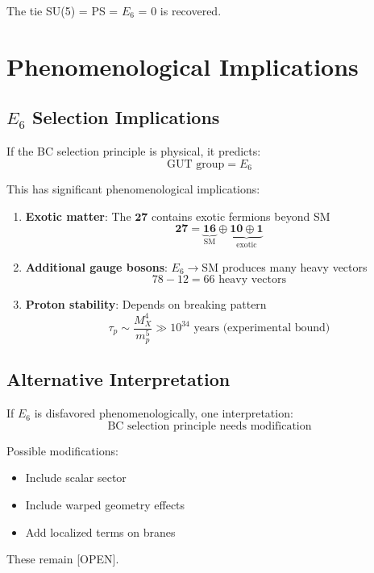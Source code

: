 \documentclass[11pt,a4paper]{article}
\newcommand{\tagOPEN}{\textcolor{red!70!black}{[OPEN]}}
\begin{document}
The tie SU(5) = PS = $E_6$ = 0 is recovered.

\section{Phenomenological Implications}
\label{app:pheno}

\subsection{$E_6$ Selection Implications}

If the BC selection principle is physical, it predicts:
\begin{equation}
\label{eq:pheno-e6}
\text{GUT group} = E_6
\end{equation}

This has significant phenomenological implications:

\begin{enumerate}
\item \textbf{Exotic matter}: The $\mathbf{27}$ contains exotic fermions beyond SM
\begin{equation}
\label{eq:exotic-content}
\mathbf{27} = \underbrace{\mathbf{16}}_{\text{SM}} \oplus \underbrace{\mathbf{10} \oplus \mathbf{1}}_{\text{exotic}}
\end{equation}

\item \textbf{Additional gauge bosons}: $E_6 \to \text{SM}$ produces many heavy vectors
\begin{equation}
\label{eq:heavy-vectors}
78 - 12 = 66 \text{ heavy vectors}
\end{equation}

\item \textbf{Proton stability}: Depends on breaking pattern
\begin{equation}
\label{eq:proton-lifetime}
\tau_p \sim \frac{M_X^4}{m_p^5} \gg 10^{34} \text{ years (experimental bound)}
\end{equation}
\end{enumerate}

\subsection{Alternative Interpretation}

If $E_6$ is disfavored phenomenologically, one interpretation:
\begin{equation}
\label{eq:alt-interpret}
\text{BC selection principle needs modification}
\end{equation}

Possible modifications:
\begin{itemize}
\item Include scalar sector
\item Include warped geometry effects
\item Add localized terms on branes
\end{itemize}

These remain \tagOPEN.

\end{document}
